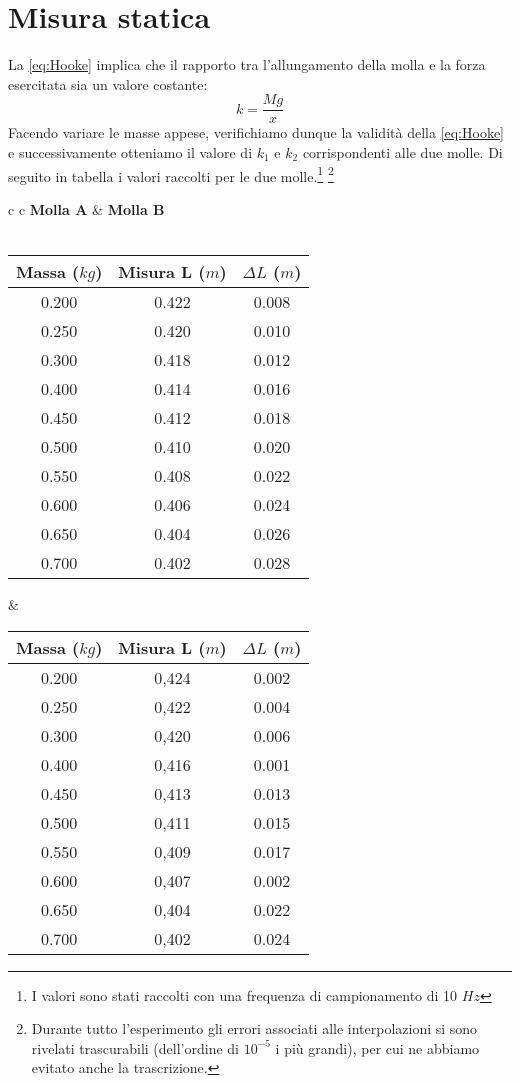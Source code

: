 \section{Misura statica}

La \ref{eq:Hooke} implica che il rapporto tra l'allungamento della molla e la forza esercitata sia un valore costante:
$$k=\frac{Mg}{x}$$
Facendo variare le masse appese, verifichiamo dunque la validità della \ref{eq:Hooke} e successivamente otteniamo il valore di $k_1$ e $k_2$ corrispondenti alle due molle.   
Di seguito in tabella i valori raccolti per le due molle.\footnote{I valori sono stati raccolti con una frequenza di campionamento di 10 $Hz$}
\footnote{Durante tutto l'esperimento gli errori associati alle interpolazioni si sono rivelati trascurabili (dell'ordine di $10^{-5}$ i più grandi), per cui ne abbiamo evitato anche la trascrizione.}

\begin{center}

\begin{tabular}{c c}
\textbf{Molla A} & \hspace{2cm} \textbf{Molla B}\\
\\
\begin{tabular}{c|c|c}
Massa ($kg$) & Misura L ($m$) & $\Delta L$ ($m$)\\
\midrule
0.200 & 0.422 & 0.008\\
0.250 & 0.420 & 0.010\\
0.300 & 0.418 & 0.012\\
0.400 & 0.414 & 0.016\\
0.450 & 0.412 & 0.018\\
0.500 & 0.410 & 0.020\\
0.550 & 0.408 & 0.022\\
0.600 & 0.406 & 0.024\\
0.650 & 0.404 & 0.026\\
0.700 & 0.402 & 0.028\\
\end{tabular}

& \hspace{2cm}

\begin{tabular}{c|c|c}
Massa ($kg$) & Misura L ($m$) & $\Delta L$ ($m$)\\
\midrule
0.200 & 0,424 & 0.002\\
0.250 & 0,422 & 0.004\\
0.300 & 0,420 & 0.006\\
0.400 & 0,416 & 0.001\\
0.450 & 0,413 & 0.013\\
0.500 & 0,411 & 0.015\\
0.550 & 0,409 & 0.017\\
0.600 & 0,407 & 0.002\\
0.650 & 0,404 & 0.022\\
0.700 & 0,402 & 0.024\\
\end{tabular}

\end{tabular}

\end{center}

